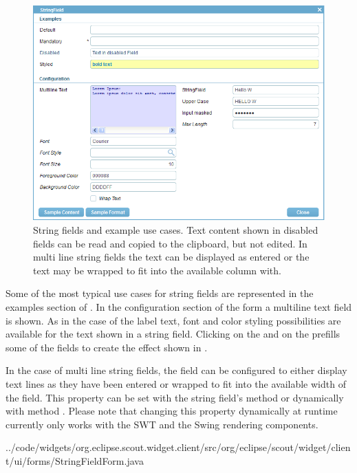 \documentclass[a4paper,10pt,twoside]{book}
\begin{document}
\begin{figure}
\includegraphics[width=15cm]{stringfield.png}
\caption{String fields and example use cases.
Text content shown in disabled fields can be read and copied to the clipboard, but not edited.
In multi line string fields the text can be displayed as entered or the text may be wrapped to fit into the available column with.}
\end{figure}

Some of the most typical use cases for string fields are represented in the examples section of .
In the configuration section of the form a multiline text field is shown.
As in the case of the label text, font and color styling possibilities are available for the text shown in a string field. 
Clicking on the  and on the  prefills some of the fields to create the effect shown in .

In the case of multi line string fields, the field can be configured to either display text lines as they have been entered or wrapped to fit into the available width of the field. 
This property can be set with the string field's method  or dynamically with method . 
Please note that changing this property dynamically at runtime currently only works with the SWT and the Swing rendering components.


{../code/widgets/org.eclipse.scout.widget.client/src/org/eclipse/scout/widget/client/ui/forms/StringFieldForm.java}
\end{document}
